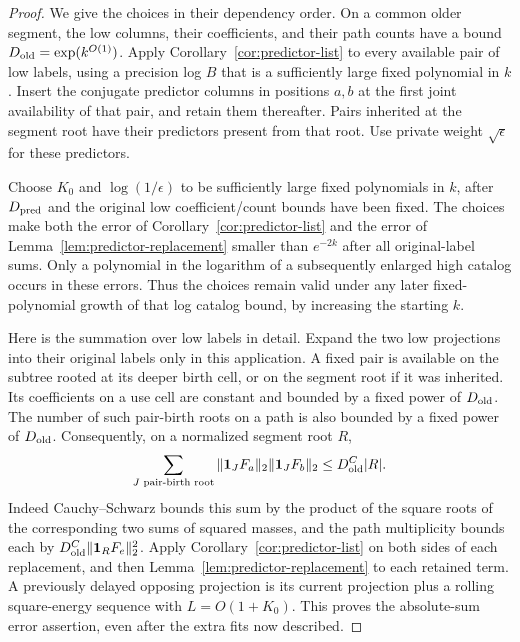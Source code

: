 \begin{proof}
We give the choices in their dependency order.  On a common older
segment, the low columns, their coefficients, and their path
counts have a bound $D_{\rm old}=\exp(k^{O(1)})$.  Apply
Corollary~\ref{cor:predictor-list} to every available pair of low
labels, using a precision log $B$ that is a sufficiently large
fixed polynomial in $k$.  Insert the conjugate predictor columns
in positions $a,b$ at the first joint availability of that pair,
and retain them thereafter.  Pairs inherited at the segment root
have their predictors present from that root.  Use private weight
$\sqrt\epsilon$ for these predictors.

Choose $K_0$ and $\log(1/\epsilon)$ to be sufficiently large
fixed polynomials in $k$, after $D_{\rm pred}$ and the original
low coefficient/count bounds have been fixed.  The choices make
both the error of Corollary~\ref{cor:predictor-list} and the
error of Lemma~\ref{lem:predictor-replacement} smaller than
$e^{-2k}$ after all original-label sums.  Only a polynomial in
the logarithm of a subsequently enlarged high catalog occurs in
these errors.  Thus the choices remain valid under any later
fixed-polynomial growth of that log catalog bound, by increasing
the starting $k$.

Here is the summation over low labels in detail.  Expand the two
low projections into their original labels only in this
application.  A fixed pair is available on the subtree rooted
at its deeper birth cell, or on the segment root if it was
inherited.  Its coefficients on a use cell are constant and
bounded by a fixed power of $D_{\rm old}$.  The number of such
pair-birth roots on a path is also bounded by a fixed power of
$D_{\rm old}$.  Consequently, on a normalized segment root $R$,
\[
 \sum_{J\text{ pair-birth root}}
        \|\mathbf 1_JF_a\|_2\|\mathbf 1_JF_b\|_2
 \le D_{\rm old}^{C}|R|.
\]
Indeed Cauchy--Schwarz bounds this sum by the product of the
square roots of the corresponding two sums of squared masses,
and the path multiplicity bounds each by
$D_{\rm old}^C\|\mathbf 1_RF_e\|_2^2$.  Apply
Corollary~\ref{cor:predictor-list} on both sides of each
replacement, and then Lemma~\ref{lem:predictor-replacement}
to each retained term.  A previously delayed opposing
projection is its current projection plus a rolling
square-energy sequence with $L=O(1+K_0)$.  This proves the
absolute-sum error assertion, even after the extra fits now
described.


\end{proof}
